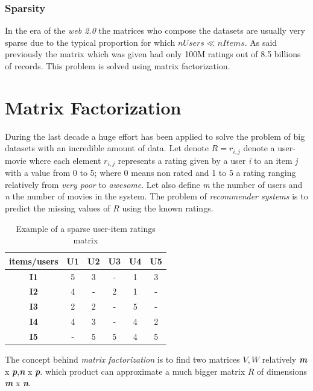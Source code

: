 \documentclass{sig-alternate-05-2015}
\begin{document}
\subsubsection{Sparsity}

In the era of the \textit{web 2.0} the matrices who compose the datasets are
usually very sparse due to the typical proportion for which  \(nUsers \ll nItems\).
As said previously the matrix which was given had only 100M ratings out of
8.5 billions of records. This problem is solved using matrix factorization.

\section{Matrix Factorization}

During the last decade a huge effort has been applied to solve the problem of
big datasets with an incredible amount of data.
Let denote $R = r_{i,j}$ denote a
user-movie where each element $r_{i,j}$ represents a rating given by
a user \textit{i} to an item \textit{j} with a value from 0 to 5; where 0 means
non rated and 1 to 5 a rating ranging relatively from \textit{very poor} to \textit{awesome}.
Let also define \textit{m} the number of users and \textit{n} the number of movies in the system.
The problem of \textit{recommender systems} is to predict the missing values of $R$
using the known ratings.\\
\begin{table}
\centering
\caption{Example of a sparse user-item ratings matrix}
\begin{tabular}{|c|c|c|c|c|c|} \hline
items/users  & \textbf{U1} & \textbf{U2} & \textbf{U3} & \textbf{U4} & \textbf{U5}\\ \hline
\textbf{I1} & 5 & 3 & - & 1 &  3  \\ \hline
\textbf{I2} & 4 & - & 2 & 1 &  -  \\ \hline
\textbf{I3} & 2 & 2 & - & 5 &  - \\ \hline
\textbf{I4} & 4 & 3 & - & 4 &  2  \\ \hline
\textbf{I5} & - & 5 & 5 & 4 &  5  \\ \hline
\end{tabular}
\end{table}
The concept behind \textit{matrix factorization} is to find two matrices
$V,W$ relatively \textit{\textbf{m}} x \textit{\textbf{p}},\textit{\textbf{n}} x \textit{\textbf{p}}. which product
can approximate a much bigger matrix $R$ of dimensions \textit{\textbf{m}} x \textit{\textbf{n}}.\\
\end{document}
